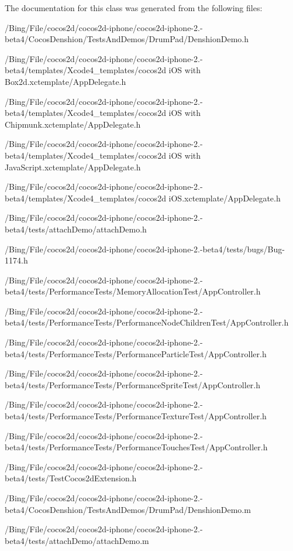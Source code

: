 The documentation for this class was generated from the following files\-:\begin{DoxyCompactItemize}
\item 
/\-Bing/\-File/cocos2d/cocos2d-\/iphone/cocos2d-\/iphone-\/2.-\/beta4/\-Cocos\-Denshion/\-Tests\-And\-Demos/\-Drum\-Pad/Denshion\-Demo.\-h\item 
/\-Bing/\-File/cocos2d/cocos2d-\/iphone/cocos2d-\/iphone-\/2.-\/beta4/templates/\-Xcode4\-\_\-templates/cocos2d i\-O\-S with Box2d.\-xctemplate/App\-Delegate.\-h\item 
/\-Bing/\-File/cocos2d/cocos2d-\/iphone/cocos2d-\/iphone-\/2.-\/beta4/templates/\-Xcode4\-\_\-templates/cocos2d i\-O\-S with Chipmunk.\-xctemplate/App\-Delegate.\-h\item 
/\-Bing/\-File/cocos2d/cocos2d-\/iphone/cocos2d-\/iphone-\/2.-\/beta4/templates/\-Xcode4\-\_\-templates/cocos2d i\-O\-S with Java\-Script.\-xctemplate/App\-Delegate.\-h\item 
/\-Bing/\-File/cocos2d/cocos2d-\/iphone/cocos2d-\/iphone-\/2.-\/beta4/templates/\-Xcode4\-\_\-templates/cocos2d i\-O\-S.\-xctemplate/App\-Delegate.\-h\item 
/\-Bing/\-File/cocos2d/cocos2d-\/iphone/cocos2d-\/iphone-\/2.-\/beta4/tests/attach\-Demo/attach\-Demo.\-h\item 
/\-Bing/\-File/cocos2d/cocos2d-\/iphone/cocos2d-\/iphone-\/2.-\/beta4/tests/bugs/Bug-\/1174.\-h\item 
/\-Bing/\-File/cocos2d/cocos2d-\/iphone/cocos2d-\/iphone-\/2.-\/beta4/tests/\-Performance\-Tests/\-Memory\-Allocation\-Test/App\-Controller.\-h\item 
/\-Bing/\-File/cocos2d/cocos2d-\/iphone/cocos2d-\/iphone-\/2.-\/beta4/tests/\-Performance\-Tests/\-Performance\-Node\-Children\-Test/App\-Controller.\-h\item 
/\-Bing/\-File/cocos2d/cocos2d-\/iphone/cocos2d-\/iphone-\/2.-\/beta4/tests/\-Performance\-Tests/\-Performance\-Particle\-Test/App\-Controller.\-h\item 
/\-Bing/\-File/cocos2d/cocos2d-\/iphone/cocos2d-\/iphone-\/2.-\/beta4/tests/\-Performance\-Tests/\-Performance\-Sprite\-Test/App\-Controller.\-h\item 
/\-Bing/\-File/cocos2d/cocos2d-\/iphone/cocos2d-\/iphone-\/2.-\/beta4/tests/\-Performance\-Tests/\-Performance\-Texture\-Test/App\-Controller.\-h\item 
/\-Bing/\-File/cocos2d/cocos2d-\/iphone/cocos2d-\/iphone-\/2.-\/beta4/tests/\-Performance\-Tests/\-Performance\-Touches\-Test/App\-Controller.\-h\item 
/\-Bing/\-File/cocos2d/cocos2d-\/iphone/cocos2d-\/iphone-\/2.-\/beta4/tests/Test\-Cocos2d\-Extension.\-h\item 
/\-Bing/\-File/cocos2d/cocos2d-\/iphone/cocos2d-\/iphone-\/2.-\/beta4/\-Cocos\-Denshion/\-Tests\-And\-Demos/\-Drum\-Pad/Denshion\-Demo.\-m\item 
/\-Bing/\-File/cocos2d/cocos2d-\/iphone/cocos2d-\/iphone-\/2.-\/beta4/tests/attach\-Demo/attach\-Demo.\-m\end{DoxyCompactItemize}
